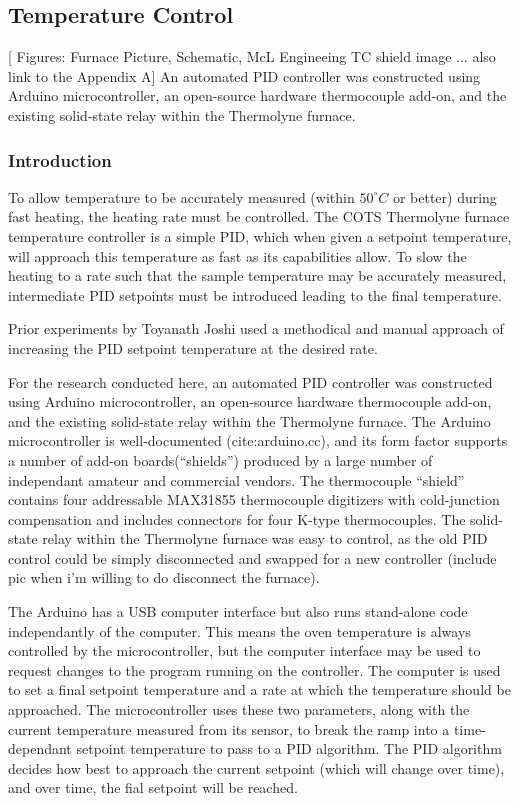 
	\subsection{Temperature Control}

	[ Figures: Furnace Picture, Schematic, McL Engineeing TC shield image ... also link to the Appendix A]
	An automated PID controller was constructed using Arduino microcontroller, an open-source hardware thermocouple add-on, and the existing solid-state relay within the Thermolyne furnace.  

	\subsubsection*{Introduction}	
	To allow temperature to be accurately measured (within $50^{\circ}C$ or better) during fast heating, the heating rate must be controlled.
	The COTS Thermolyne furnace temperature controller is a simple PID, which when given a setpoint temperature, will approach this temperature as fast as its capabilities allow.
	To slow the heating to a rate such that the sample temperature may be accurately measured, intermediate PID setpoints must be introduced leading to the final temperature.

	Prior experiments by Toyanath Joshi used a methodical and manual approach of increasing the PID setpoint temperature at the desired rate.
	
	For the research conducted here, an automated PID controller was constructed using Arduino microcontroller, an open-source hardware thermocouple add-on, and the existing solid-state relay within the Thermolyne furnace.  
	The Arduino microcontroller is well-documented (cite:arduino.cc), and its form factor supports a number of add-on boards(``shields'') produced by a large number of independant amateur and commercial vendors.
	The thermocouple ``shield'' contains four addressable MAX31855 thermocouple digitizers with cold-junction compensation and includes connectors for four K-type thermocouples.
	The solid-state relay within the Thermolyne furnace was easy to control, as the old PID control could be simply disconnected and swapped for a new controller (include pic when i'm willing to do disconnect the furnace).

	The Arduino has a USB computer interface but also runs stand-alone code independantly of the computer.
	This means the oven temperature is always controlled by the microcontroller, but the computer interface may be used to request changes to the program running on the controller.
	The computer is used to set a final setpoint temperature and a rate at which the temperature should be approached.  
	The microcontroller uses these two parameters, along with the current temperature measured from its sensor, to break the ramp into a time-dependant setpoint temperature to pass to a PID algorithm.
	The PID algorithm decides how best to approach the current setpoint (which will change over time), and over time, the fial setpoint will be reached.

